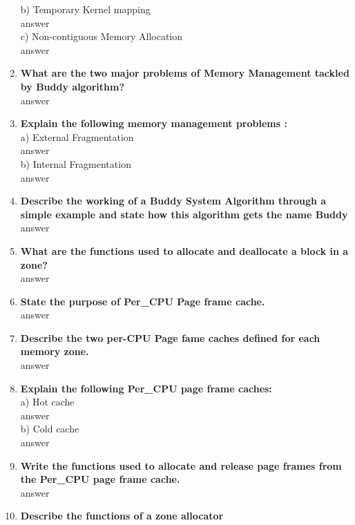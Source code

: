 \documentclass[a4paper,12pt]{article}
\begin{document}
\begin{flushleft}
\begin{enumerate}
b) Temporary Kernel mapping\\{\color{red}answer}\\
c) Non-contiguous Memory Allocation\\{\color{red}answer}\\
\item \textbf{ What are the two major problems of Memory Management tackled by Buddy algorithm?}\\
{\color{red}answer}\\
\item \textbf{ Explain the following memory management problems :}\\
a) External Fragmentation\\{\color{red}answer}\\
b) Internal Fragmentation\\{\color{red}answer}\\
\item \textbf{ Describe the working of a Buddy System Algorithm through a simple example and state how this algorithm gets the name Buddy}\\
{\color{red}answer}\\
\item \textbf{ What are the functions used to allocate and deallocate a block in a zone?}\\
{\color{red}answer}\\
\item \textbf{ State the purpose of Per\_CPU Page frame cache.}\\
{\color{red}answer}\\
\item \textbf{ Describe the two per-CPU Page fame caches defined for each memory zone.}\\
{\color{red}answer}\\
\item \textbf{ Explain the following Per\_CPU page frame caches:}\\
a) Hot cache\\{\color{red}answer}\\
 b) Cold cache\\{\color{red}answer}\\
\item \textbf{  Write the functions used to allocate and release page frames from the Per\_CPU page frame cache.}\\
{\color{red}answer}\\
\item \textbf{  Describe the functions of a zone allocator}\\

\end{enumerate}
\end{flushleft}
\end{document}
